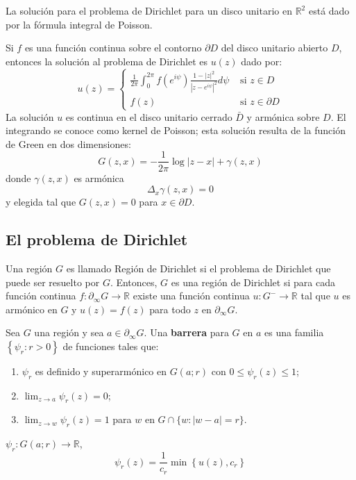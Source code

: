 \begin{cajita}
    \begin{ejemplo}
        La solución para el problema de Dirichlet para un disco unitario en $\mathbb{R}^2$ está dado por la fórmula integral de Poisson.

Si $f$ es una función continua sobre el contorno $\partial D$ del disco unitario abierto $D$, entonces la solución al problema de Dirichlet es $u(z)$ dado por:
$$
u(z)= \begin{cases}\frac{1}{2 \pi} \int_0^{2 \pi} f\left(e^{i \psi}\right) \frac{1-|z|^2}{\left|z-e^{i \psi}\right|^2} d \psi & \text { si } z \in D \\ f(z) & \text { si } z \in \partial D\end{cases}
$$
La solución $u$ es continua en el disco unitario cerrado $\bar{D}$ y armónica sobre $D$.
El integrando se conoce como kernel de Poisson; esta solución resulta de la función de Green en dos dimensiones:
$$
G(z, x)=-\frac{1}{2 \pi} \log |z-x|+\gamma(z, x)
$$
donde $\gamma(z, x)$ es armónica
$$
\Delta_x \gamma(z, x)=0
$$
y elegida tal que $G(z, x)=0$ para $x \in \partial D$.
    \end{ejemplo}
\end{cajita}

\subsection{El problema de Dirichlet}

\begin{definicion}
    Una región $G$ es llamado Región de Dirichlet  si el problema de Dirichlet que puede ser resuelto por $G$. Entonces, $G$ es una región de Dirichlet si para cada función continua $f: \partial_{\infty} G \rightarrow \mathbb{R}$ existe una función continua $u: G^{-} \rightarrow \mathbb{R}$ tal que $u$ es armónico en $G$ y $u(z)=f(z)$ para todo $z$ en $\partial_{\infty} G$.
\end{definicion}


\begin{definicion}
    Sea $G$ una región y sea $a \in \partial_{\infty} G$. Una \textbf{barrera} para $G$ en $a$ es una familia $\left\{\psi_r: r>0\right\}$ de funciones tales que:
    \begin{enumerate}
        \item $\psi_r$ es definido y superarmónico en $G(a ; r)$ con $0 \leq \psi_r(z) \leq 1$;
        \item $\lim _{z \rightarrow a} \psi_r(z)=0$;
        \item $\lim _{z \rightarrow w} \psi_r(z)=1$ para $w$ en $G \cap\{w:|w-a|=r\}$.
    \end{enumerate}
    \begin{cajita}
        $\psi_r: G(a ; r) \rightarrow \mathbb{R}$,
        $$\psi_r(z)=\frac{1}{c_r} \min \left\{u(z), c_r\right\}$$
    \end{cajita}
\end{definicion}



